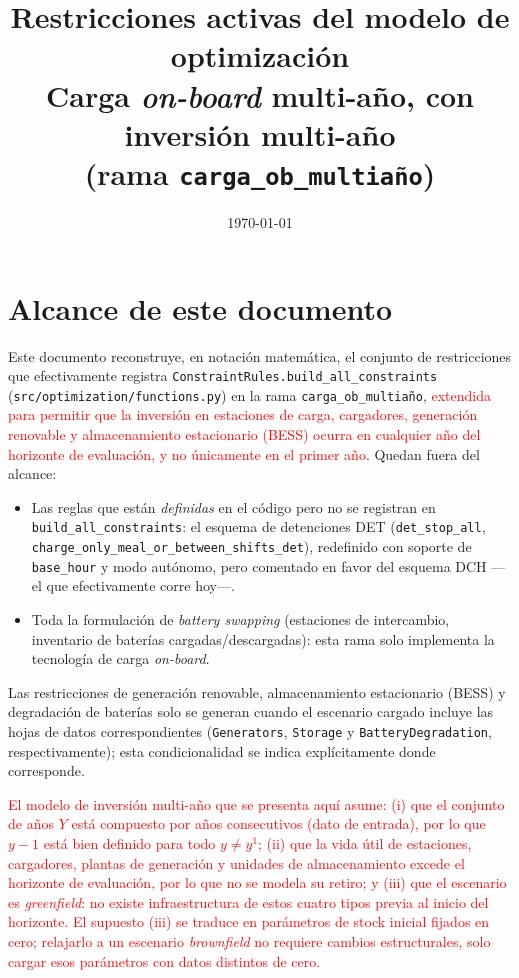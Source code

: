 \documentclass[11pt]{article}
\title{Restricciones activas del modelo de optimización\\[2pt]\large Carga \textit{on-board} multi-año, con inversión multi-año\\[2pt] (rama \texttt{carga\_ob\_multiaño})}
\date{\today}
\newcommand{\change}[1]{\textcolor{red}{#1}}
\begin{document}
\maketitle

\section*{Alcance de este documento}

Este documento reconstruye, en notación matemática, el conjunto de restricciones que efectivamente registra \texttt{ConstraintRules.build\_all\_constraints} (\texttt{src/optimization/functions.py}) en la rama \texttt{carga\_ob\_multiaño}, \change{extendida para permitir que la inversión en estaciones de carga, cargadores, generación renovable y almacenamiento estacionario (BESS) ocurra en cualquier año del horizonte de evaluación, y no únicamente en el primer año}. Quedan fuera del alcance:

\begin{itemize}
    \item Las reglas que están \emph{definidas} en el código pero no se registran en \texttt{build\_all\_constraints}: el esquema de detenciones DET (\texttt{det\_stop\_all}, \texttt{charge\_only\_meal\_or\_between\_shifts\_det}), redefinido con soporte de \texttt{base\_hour} y modo autónomo, pero comentado en favor del esquema DCH —el que efectivamente corre hoy—.
    \item Toda la formulación de \textit{battery swapping} (estaciones de intercambio, inventario de baterías cargadas/descargadas): esta rama solo implementa la tecnología de carga \textit{on-board}.
\end{itemize}

Las restricciones de generación renovable, almacenamiento estacionario (BESS) y degradación de baterías solo se generan cuando el escenario cargado incluye las hojas de datos correspondientes (\texttt{Generators}, \texttt{Storage} y \texttt{BatteryDegradation}, respectivamente); esta condicionalidad se indica explícitamente donde corresponde.

\change{El modelo de inversión multi-año que se presenta aquí asume: (i) que el conjunto de años $Y$ está compuesto por años consecutivos (dato de entrada), por lo que $y-1$ está bien definido para todo $y\neq y^1$; (ii) que la vida útil de estaciones, cargadores, plantas de generación y unidades de almacenamiento excede el horizonte de evaluación, por lo que no se modela su retiro; y (iii) que el escenario es \textit{greenfield}: no existe infraestructura de estos cuatro tipos previa al inicio del horizonte. El supuesto (iii) se traduce en parámetros de stock inicial fijados en cero; relajarlo a un escenario \textit{brownfield} no requiere cambios estructurales, solo cargar esos parámetros con datos distintos de cero.}
\end{document}
